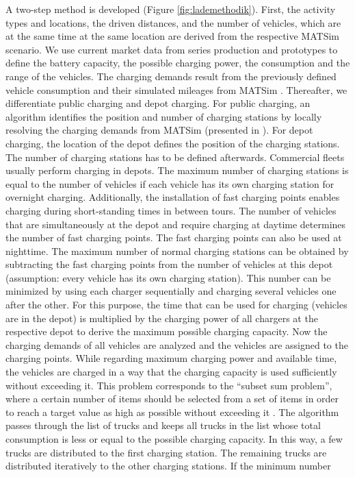 \documentclass[3p,times,procedia]{elsarticle}
\begin{document}

A two-step method is developed (Figure \ref{fig:lademethodik}). First, the activity types and locations, the driven distances, and the number of vehicles, which are at the same time at the same location are derived from the respective MATSim scenario. We use current market data from series production and prototypes to define the battery capacity, the possible charging power, the consumption and the range of the vehicles. The charging demands result from the previously defined vehicle consumption and their simulated mileages from MATSim \cite{Jahn.2020}. Thereafter, we differentiate public charging and depot charging. For public charging, an algorithm identifies the position and number of charging stations by locally resolving the charging demands from MATSim (presented in \cite{Jahn.2020}). For depot charging, the location of the depot defines the position of the charging stations. The number of charging stations has to be defined afterwards. Commercial fleets usually perform charging in depots. The maximum number of charging stations is equal to the number of vehicles if each vehicle has its own charging station for overnight charging. Additionally, the installation of fast charging points enables charging during short-standing times in between tours. The number of vehicles that are simultaneously at the depot and require charging at daytime determines the number of fast charging points. The fast charging points can also be used at nighttime. The maximum number of normal charging stations can be obtained by subtracting the fast charging points from the number of vehicles at this depot (assumption: every vehicle has its own charging station). This number can be minimized by using each charger sequentially and charging several vehicles one after the other. For this purpose, the time that can be used for charging (vehicles are in the depot) is multiplied by the charging power of all chargers at the respective depot to derive the maximum possible charging capacity. Now the charging demands of all vehicles are analyzed and the vehicles are assigned to the charging points. While regarding maximum charging power and available time, the vehicles are charged in a way that the charging capacity is used sufficiently without exceeding it. This problem corresponds to the “subset sum problem”, where a certain number of items should be selected from a set of items in order to reach a target value as high as possible without exceeding it \cite{ALBERTOCAPRARA}. The algorithm passes through the list of trucks and keeps all trucks in the list whose total consumption is less or equal to the possible charging capacity. In this way, a few trucks are distributed to the first charging station. The remaining trucks are distributed iteratively to the other charging stations. If the minimum number 
\end{document}
